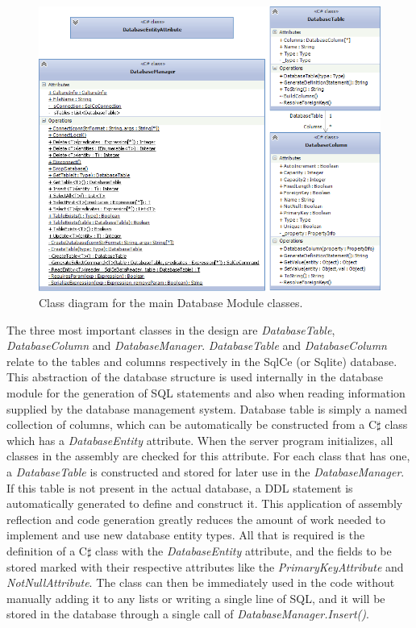 \begin{figure}[h!]
    \centering
    \includegraphics[width=\textwidth]{dbmancd}
    \caption{Class diagram for the main Database Module classes.}
    \label{fig:dbclasses}
\end{figure}

The three most important classes in the design are \emph{DatabaseTable}, \emph{DatabaseColumn} and \emph{DatabaseManager}. \emph{DatabaseTable} and \emph{DatabaseColumn} relate to the tables and columns respectively in the SqlCe (or Sqlite) database. This abstraction of the database structure is used internally in the database module for the generation of SQL statements and also when reading information supplied by the database management system. Database table is simply a named collection of columns, which can be automatically be constructed from a C$\sharp$ class which has a \emph{DatabaseEntity} attribute. When the server program initializes, all classes in the assembly are checked for this attribute. For each class that has one, a \emph{DatabaseTable} is constructed and stored for later use in the \emph{DatabaseManager}. If this table is not present in the actual database, a DDL statement is automatically generated to define and construct it. This application of assembly reflection and code generation greatly reduces the amount of work needed to implement and use new database entity types. All that is required is the definition of a C$\sharp$ class with the \emph{DatabaseEntity} attribute, and the fields to be stored marked with their respective attributes like the \emph{PrimaryKeyAttribute} and \emph{NotNullAttribute}. The class can then be immediately used in the code without manually adding it to any lists or writing a single line of SQL, and it will be stored in the database through a single call of \emph{DatabaseManager.Insert()}.

